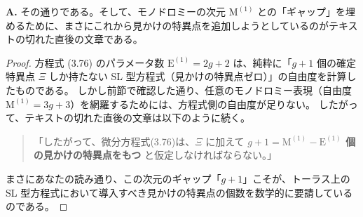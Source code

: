 \begin{Q}[【核心】パラメータのカウント $\mathrm{E}^{(1)} = 2g+2$ を計算した時点では、方程式 (3.76) には「見かけの特異点」が存在していないと仮定しているのか？]
\textbf{A.} その通りである。そして、モノドロミーの次元 $\mathrm{M}^{(1)}$ との「ギャップ」を埋めるために、まさにこれから見かけの特異点を追加しようとしているのがテキストの切れた直後の文章である。

\begin{proof}
方程式 (3.76) のパラメータ数 $\mathrm{E}^{(1)} = 2g+2$ は、純粋に「$g+1$ 個の確定特異点 $\Xi$ しか持たない SL 型方程式（見かけの特異点ゼロ）」の自由度を計算したものである。
しかし前節で確認した通り、任意のモノドロミー表現（自由度 $\mathrm{M}^{(1)} = 3g+3$）を網羅するためには、方程式側の自由度が足りない。
したがって、テキストの切れた直後の文章は以下のように続く。
\begin{quote}
「したがって、微分方程式(3.76)は、$\Xi$ に加えて \textbf{$g+1 = \mathrm{M}^{(1)} - \mathrm{E}^{(1)}$ 個の見かけの特異点をもつ} と仮定しなければならない。」
\end{quote}
まさにあなたの読み通り、この次元のギャップ「$g+1$」こそが、トーラス上の SL 型方程式において導入すべき見かけの特異点の個数を数学的に要請しているのである。
\end{proof}
\end{Q}

